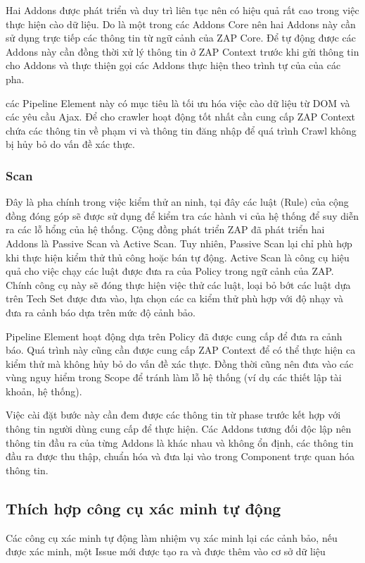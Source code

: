 \documentclass[./../main.tex]{subfiles}
\begin{document}
Hai Addons được phát triển và duy trì liên tục nên có hiệu quả rất cao trong việc thực hiện cào dữ liệu. Do là một trong các Addons Core nên hai Addons này cần sử dụng trực tiếp các thông tin từ ngữ cảnh của ZAP Core. Để tự động được các Addons này cần đồng thời xử lý thông tin ở ZAP Context trước khi gửi thông tin cho Addons và thực thiện gọi các Addons thực hiện theo trình tự của của các pha.

các Pipeline Element này có mục tiêu là tối ưu hóa việc cào dữ liệu từ DOM và các yêu cầu Ajax. Để cho crawler hoạt động tốt nhất cần cung cấp ZAP Context chứa các thông tin về phạm vi và thông tin đăng nhập để quá trình Crawl không bị hủy bỏ do vấn đề xác thực.
\subsubsection{Scan}

Đây là pha chính trong việc kiểm thử an ninh, tại đây các luật (Rule) của cộng đồng đóng góp sẽ được sử dụng để kiểm tra các hành vi của hệ thống để suy diễn ra các lỗ hổng của hệ thống. Cộng đồng phát triển ZAP đã phát triển hai Addons là Passive Scan và Active Scan. Tuy nhiên, Passive Scan lại chỉ phù hợp khi thực hiện kiểm thử thủ công hoặc bán tự động. Active Scan là công cụ hiệu quả cho việc chạy các luật được đưa ra của Policy trong ngữ cảnh của ZAP. Chính công cụ này sẽ đóng thực hiện việc thử các luật, loại bỏ bớt các luật dựa trên Tech Set được đưa vào, lựa chọn các ca kiểm thử phù hợp với độ nhạy và đưa ra cảnh báo dựa trên mức độ cảnh bảo.


Pipeline Element hoạt động dựa trên Policy đã được cung cấp để đưa ra cảnh báo. Quá trình này cũng cần được cung cấp ZAP Context để có thể thực hiện ca kiểm thử mà không hủy bỏ do vấn đề xác thực. Đồng thời cũng nên đưa vào các vùng nguy hiểm trong Scope để tránh làm lỗ hệ thống (ví dụ các thiết lập tài khoản, hệ thống).


Việc cài đặt bước này cần đem được các thông tin từ phase trước kết hợp với thông tin người dùng cung cấp để thực hiện. Các Addons tương đối độc lập nên thông tin đầu ra của từng Addons là khác nhau và không ổn định, các thông tin đầu ra được thu thập, chuẩn hóa và đưa lại vào trong Component trực quan hóa thông tin.

\subsection{Thích hợp công cụ xác minh tự động}
Các công cụ xác minh tự động làm nhiệm vụ xác minh lại các cảnh bảo, nếu được xác minh, một Issue mới được tạo ra và được thêm vào cơ sở dữ liệu
\end{document}
